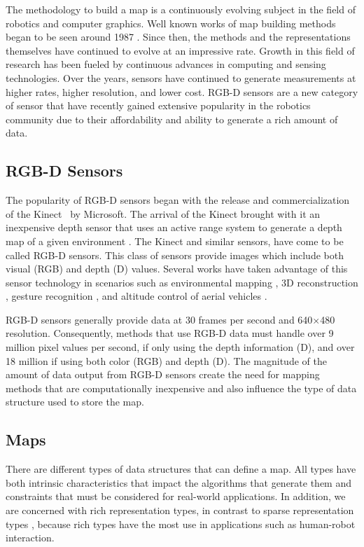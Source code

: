 The methodology to build a map is a continuously evolving subject in the field
of robotics and computer graphics. Well known works of map building methods
began to be seen around 1987 \cite{Lorensen1987}. Since then, the methods and
the representations themselves have continued to evolve at an impressive rate.
Growth in this field of research has been fueled by continuous advances in
computing and sensing technologies. Over the years, sensors have continued to
generate measurements at higher rates, higher resolution, and lower cost. RGB-D
sensors are a new category of sensor that have recently gained extensive
popularity in the robotics community due to their affordability and ability to
generate a rich amount of data.

\subsection{RGB-D Sensors}

The popularity of RGB-D sensors began with the release and commercialization of
the Kinect\texttrademark ~ by Microsoft. The arrival of the Kinect brought with
it an inexpensive depth sensor that uses an active range system to generate a
depth map of a given environment \cite{freedman2012depth}. The Kinect and similar
sensors, have come to be called RGB-D sensors. This class of sensors provide
images which include both visual (RGB) and depth (D) values.
Several works have taken advantage of this sensor technology in scenarios such
as environmental mapping \cite{henry2012rgb}, 3D reconstruction
\cite{Newcombe2011a}, gesture recognition \cite{Xia2011}, and altitude control of
aerial vehicles \cite{Stowers2011}.

RGB-D sensors generally provide data at 30 frames per second and 640$\times$480
resolution. Consequently, methods that use RGB-D data must handle over 9 million
pixel values per second, if only using the depth information (D), and over 18
million if using both color (RGB) and depth (D). The magnitude of the amount of
data output from RGB-D sensors create the need for mapping methods that are
computationally inexpensive and also influence the type of data structure used
to store the map.

\subsection{Maps}

There are different types of data structures that can define a map. All types
have both intrinsic characteristics that impact the algorithms that generate
them and constraints that must be considered for real-world applications. In
addition, we are concerned with rich representation types, in contrast to sparse
representation types \cite{Dissanayake2001}, because rich types have the most
use in applications such as human-robot interaction.

